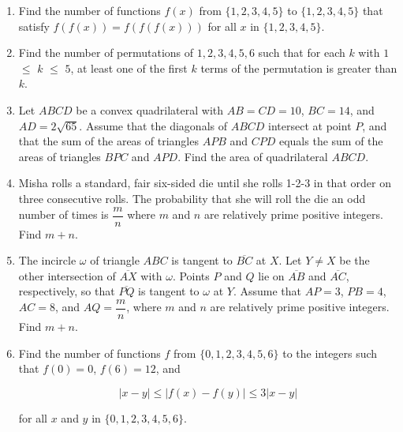 \documentclass{article}
\begin{document}
\begin{enumerate}[label=\arabic*., itemsep=0.5em]
\par \vspace{0.5em}\item Find the number of functions $f(x)$ from $\{1, 2, 3, 4, 5\}$ to $\{1, 2, 3, 4, 5\}$ that satisfy $f(f(x)) = f(f(f(x)))$ for all $x$ in $\{1, 2, 3, 4, 5\}$.\par \vspace{0.5em}\item Find the number of permutations of $1, 2, 3, 4, 5, 6$ such that for each $k$ with $1$ $\leq$ $k$ $\leq$ $5$, at least one of the first $k$ terms of the permutation is greater than $k$.\par \vspace{0.5em}\item Let $ABCD$ be a convex quadrilateral with $AB = CD = 10$, $BC = 14$, and $AD = 2\sqrt{65}$. Assume that the diagonals of $ABCD$ intersect at point $P$, and that the sum of the areas of triangles $APB$ and $CPD$ equals the sum of the areas of triangles $BPC$ and $APD$. Find the area of quadrilateral $ABCD$.\par \vspace{0.5em}\item Misha rolls a standard, fair six-sided die until she rolls 1-2-3 in that order on three consecutive rolls. The probability that she will roll the die an odd number of times is $\dfrac{m}{n}$ where $m$ and $n$ are relatively prime positive integers. Find $m+n$.\par \vspace{0.5em}\item The incircle $\omega$ of triangle $ABC$ is tangent to $\overline{BC}$ at $X$. Let $Y \neq X$ be the other intersection of $\overline{AX}$ with $\omega$. Points $P$ and $Q$ lie on $\overline{AB}$ and $\overline{AC}$, respectively, so that $\overline{PQ}$ is tangent to $\omega$ at $Y$. Assume that $AP = 3$, $PB = 4$, $AC = 8$, and $AQ = \dfrac{m}{n}$, where $m$ and $n$ are relatively prime positive integers. Find $m+n$.\par \vspace{0.5em}\item Find the number of functions $f$ from $\{0, 1, 2, 3, 4, 5, 6\}$ to the integers such that $f(0) = 0$, $f(6) = 12$, and


\begin{equation*}
|x - y|  \leq  |f(x) - f(y)|  \leq  3|x - y|
\end{equation*}


for all $x$ and $y$ in $\{0, 1, 2, 3, 4, 5, 6\}$.




\end{enumerate}
\end{document}
